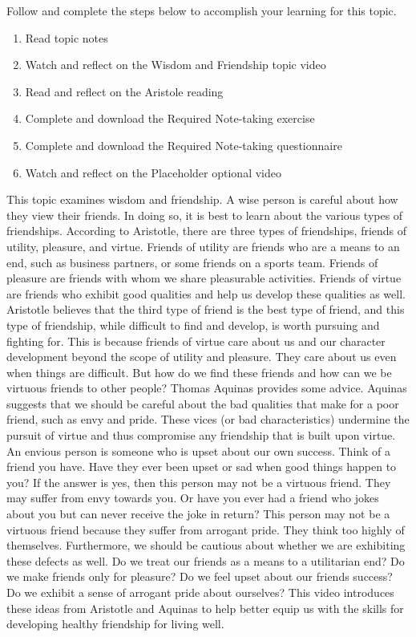 \documentclass[
]{book}
\providecommand{\tightlist}{%
  \setlength{\itemsep}{0pt}\setlength{\parskip}{0pt}}
\begin{document}
Follow and complete the steps below to accomplish your learning for this topic.

\begin{enumerate}
\def\labelenumi{\arabic{enumi}.}
\tightlist
\item
  Read topic notes
\item
  Watch and reflect on the Wisdom and Friendship topic video
\item
  Read and reflect on the Aristole reading
\item
  Complete and download the Required Note-taking exercise
\item
  Complete and download the Required Note-taking questionnaire
\item
  Watch and reflect on the Placeholder optional video
\end{enumerate}

This topic examines wisdom and friendship. A wise person is careful about how they view their friends. In doing so, it is best to learn about the various types of friendships. According to Aristotle, there are three types of friendships, friends of utility, pleasure, and virtue. Friends of utility are friends who are a means to an end, such as business partners, or some friends on a sports team. Friends of pleasure are friends with whom we share pleasurable activities. Friends of virtue are friends who exhibit good qualities and help us develop these qualities as well. Aristotle believes that the third type of friend is the best type of friend, and this type of friendship, while difficult to find and develop, is worth pursuing and fighting for. This is because friends of virtue care about us and our character development beyond the scope of utility and pleasure. They care about us even when things are difficult. But how do we find these friends and how can we be virtuous friends to other people? Thomas Aquinas provides some advice. Aquinas suggests that we should be careful about the bad qualities that make for a poor friend, such as envy and pride. These vices (or bad characteristics) undermine the pursuit of virtue and thus compromise any friendship that is built upon virtue. An envious person is someone who is upset about our own success. Think of a friend you have. Have they ever been upset or sad when good things happen to you? If the answer is yes, then this person may not be a virtuous friend. They may suffer from envy towards you. Or have you ever had a friend who jokes about you but can never receive the joke in return? This person may not be a virtuous friend because they suffer from arrogant pride. They think too highly of themselves. Furthermore, we should be cautious about whether we are exhibiting these defects as well. Do we treat our friends as a means to a utilitarian end? Do we make friends only for pleasure? Do we feel upset about our friends success? Do we exhibit a sense of arrogant pride about ourselves? This video introduces these ideas from Aristotle and Aquinas to help better equip us with the skills for developing healthy friendship for living well.
\end{document}
